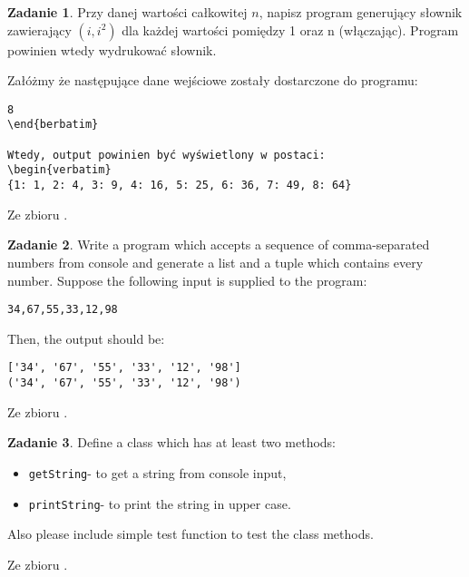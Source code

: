 \documentclass[11pt]{article}
\theoremstyle{definition}
\newtheorem{zadanie}{Zadanie}
\newcommand{\fromA}{\small Ze zbioru \cite{python100}.}
\begin{document}
\begin{zadanie}

Przy danej wartości całkowitej $n$, napisz program generujący słownik zawierający $(i, i^2)$ dla każdej wartości pomiędzy 1 oraz n (włączając). Program powinien wtedy wydrukować słownik.

Załóżmy że następujące dane wejściowe zostały dostarczone do programu:

\begin{verbatim}
8
\end{berbatim}

Wtedy, output powinien być wyświetlony w postaci:
\begin{verbatim}
{1: 1, 2: 4, 3: 9, 4: 16, 5: 25, 6: 36, 7: 49, 8: 64}
\end{verbatim}
\fromA
\end{zadanie}

\begin{zadanie}
Write a program which accepts a sequence of comma-separated numbers from console and generate a list and a tuple which contains every number.
Suppose the following input is supplied to the program:
\begin{verbatim}
34,67,55,33,12,98
\end{verbatim}
Then, the output should be:
\begin{verbatim}
['34', '67', '55', '33', '12', '98']
('34', '67', '55', '33', '12', '98')
\end{verbatim}

\fromA
\end{zadanie}

\begin{zadanie}
Define a class which has at least two methods:
\begin{itemize}
\item\texttt{getString}- to get a string from console input,
\item\texttt{printString}- to print the string in upper case.
\end{itemize}
Also please include simple test function to test the class methods.

\fromA
\end{zadanie}
\end{document}
